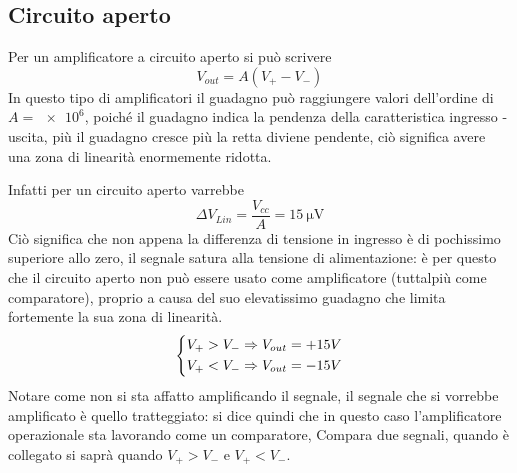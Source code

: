 \documentclass[a4paper, 15pt]{article}
\begin{document}
\subsection{Circuito aperto}
\begin{adjustwidth}{2in}{}		
		Per un amplificatore a circuito aperto si può scrivere
		\[V_{out} = A(V_+-V_-)\]
		In questo tipo di amplificatori il guadagno può raggiungere valori dell'ordine di $A = \num{e6}$, poiché il guadagno indica la pendenza della caratteristica ingresso - uscita, più il guadagno cresce più la retta diviene pendente, ciò significa avere una zona di linearità enormemente ridotta.
		\begin{figure}[H]
			\centering
			 \quad {}
		\end{figure}
		Infatti per un circuito aperto varrebbe 
		\[\Delta V_{Lin} = \dfrac{V_{cc}}{A} = \SI{15}{\micro\volt}\] 
		Ciò significa che non appena la differenza di tensione in ingresso è di pochissimo superiore allo zero, il segnale satura alla tensione di alimentazione: è per questo che il circuito aperto non può essere usato come amplificatore (tuttalpiù come comparatore), proprio a causa del suo elevatissimo guadagno che limita fortemente la sua zona di linearità.
   		\[\begin{dcases}
   			V_+>V_- \Rightarrow V_{out} = +15 V \\
   			V_+<V_- \Rightarrow V_{out} = -15 V \\
   		\end{dcases}\]   		
   		Notare come non si sta affatto amplificando il segnale, il segnale che si vorrebbe amplificato è quello tratteggiato: si dice quindi che in questo caso l'amplificatore operazionale sta lavorando come un comparatore, Compara due segnali, quando è collegato si saprà quando $V_+>V_-$ e $V_+<V_-$. 
\end{adjustwidth}
\newpage
\end{document}
